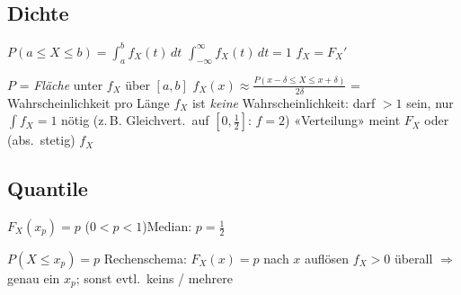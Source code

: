 \subsection{Dichte}
\begin{formel}
$\displaystyle P(a\le X\le b)=\int_a^b f_X(t)\,dt$\qquad
$\displaystyle\int_{-\infty}^{\infty}f_X(t)\,dt=1$\qquad
$f_X=F_X'$
\end{formel}
\begin{itemize}
\pfeil $P$ = \emph{Fläche} unter $f_X$ über $[a,b]$
\pfeil $f_X(x)\approx\frac{P(x-\delta\le X\le x+\delta)}{2\delta}$ = Wahrscheinlichkeit pro Länge
\pfeil $f_X$ ist \emph{keine} Wahrscheinlichkeit: darf $>1$ sein, nur $\int f_X=1$ nötig (z.\,B. Gleichvert.\ auf $[0,\tfrac12]$: $f=2$)
\pfeil «Verteilung» meint $F_X$ oder (abs.\ stetig) $f_X$
\end{itemize}

\subsection{Quantile}
\begin{formel}
$F_X(x_p)=p$ \quad ($0<p<1$)\qquad Median: $p=\tfrac12$
\end{formel}
\begin{itemize}
\pfeil $P(X\le x_p)=p$
\pfeil Rechenschema: $F_X(x)=p$ nach $x$ auflösen
\pfeil $f_X>0$ überall $\Rightarrow$ genau ein $x_p$; sonst evtl.\ keins / mehrere
\end{itemize}

